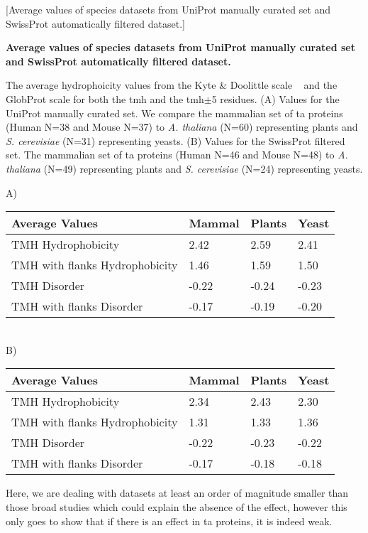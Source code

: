 \begin{table}[]
\centering
{}[Average values of species datasets from UniProt manually curated set and SwissProt automatically filtered dataset.]
{\textbf{Average values of species datasets from UniProt manually curated set and SwissProt automatically filtered dataset.}

The average hydrophoicity values from the Kyte \& Doolittle scale ~\cite{Kyte1982} and the GlobProt scale \cite{Linding2003} for both the \gls{tmh} and the \gls{tmh}$\pm$5 residues.
(A) Values for the UniProt manually curated set. We compare the mammalian set of \gls{ta} proteins (Human N=38 and Mouse N=37) to \textit{A. thaliana} (N=60) representing plants  and  \textit{S. cerevisiae} (N=31) representing yeasts.
(B) Values for the SwissProt filtered set. The mammalian set of \gls{ta} proteins (Human N=46 and Mouse N=48) to \textit{A. thaliana} (N=49) representing plants  and  \textit{S. cerevisiae} (N=24) representing yeasts.
}
\label{average_species_ta}
A)
\begin{tabular}{llll}
	\toprule
Average Values                 & Mammal  & Plants  & Yeast   \\
\midrule
TMH Hydrophobicity             & 2.42   & 2.59   & 2.41  \\
TMH with flanks Hydrophobicity & 1.46   & 1.59   & 1.50  \\
TMH Disorder                   & -0.22  & -0.24  & -0.23 \\
TMH with flanks Disorder       & -0.17  & -0.19  & -0.20 \\
\bottomrule

\end{tabular}
\\
B)
\begin{tabular}{llll}
	\toprule
Average Values                 & Mammal  			& Plants  & Yeast   \\
\midrule
TMH Hydrophobicity             & 2.34          & 2.43   & 2.30  \\
TMH with flanks Hydrophobicity & 1.31          & 1.33   & 1.36  \\
TMH Disorder                   & -0.22         & -0.23  & -0.22 \\
TMH with flanks Disorder       & -0.17         & -0.18  & -0.18 \\
\bottomrule
\end{tabular}
\end{table}



Here, we are dealing with datasets at least an order of magnitude smaller than those broad studies which could explain the absence of the effect, however this only goes to show that if there is an effect in \gls{ta} proteins, it is indeed weak.


